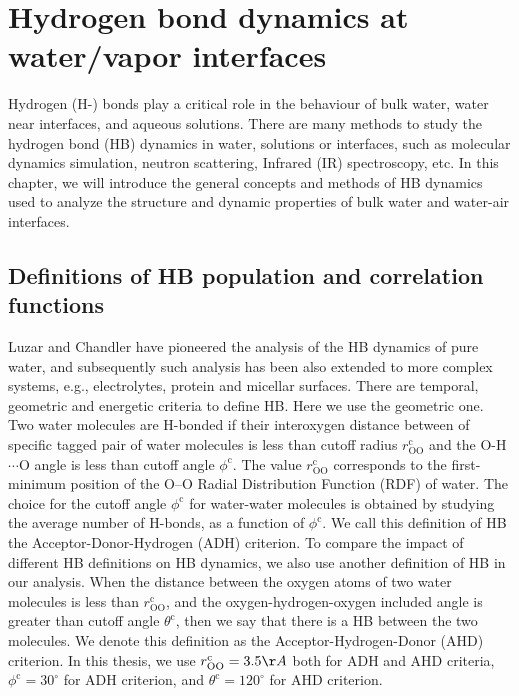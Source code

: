 \chapter{Hydrogen bond dynamics at water/vapor interfaces}\label{CHAPTER_HB}
Hydrogen (H-) bonds play a critical role in the behaviour of bulk water,\cite{Eisenberg1969,Luzar1996,Cabane2005} 
water near interfaces,\cite{Chowdhary2008} and aqueous solutions. \cite{Naslund2005} 
There are many methods to study the hydrogen bond (HB) dynamics in water, solutions or interfaces, 
such as molecular dynamics simulation,\cite{Tongraar2006,Chanda2006,Tongraar2010,Chowdhary2008,Banerjee2016} neutron scattering, 
Infrared (IR) spectroscopy,\cite{Werhahn2011,Fournier2016} etc.
In this chapter, we will introduce the general concepts and methods of HB dynamics \cite{AL96,Luzar1996,DC87} used to analyze the structure 
and dynamic properties of bulk water and water-air interfaces. 

\section{Definitions of HB population and correlation functions}
Luzar and Chandler \cite{AL96} have pioneered the analysis of the HB dynamics of pure water, and
subsequently such analysis has been also extended to more complex systems, e.g., electrolytes, \cite{AC00} protein and  micellar surfaces. \cite{SP05}
There are temporal, geometric\cite{Kumar2007} and energetic criteria \cite{Sciortino1989}to define HB.
Here we use the geometric one.
Two water molecules are H-bonded if their interoxygen distance between of specific tagged pair of water molecules 
is less than cutoff radius $r^{\text{c}}_{\text{OO}}$ and
the O-H$\cdots$O angle is less than cutoff angle $\phi^{\text{c}}$. \cite{AKS86,JT90,SB02} 
The value $r^{\text{c}}_{\text{OO}}$ corresponds to the first-minimum position of the O--O Radial Distribution Function (RDF) of water. \cite{Sciortino1989}   
The choice for the cutoff angle $\phi^{\text{c}}$ for water-water molecules is obtained by studying the average number of H-bonds,
as a function of $\phi^{\text{c}}$. \cite{Luzar1993} We call this definition of HB the Acceptor-Donor-Hydrogen (ADH) criterion. 
To compare the impact of different HB definitions on HB dynamics, we also use another definition of HB in our analysis. 
When the distance between the oxygen atoms of two water molecules is less than $r^{\text{c}}_{\text{OO}}$, 
and the oxygen-hydrogen-oxygen included angle is greater than cutoff angle $\theta^{\text{c}}$, then we say that there is a HB between the two molecules. 
We denote this definition as the Acceptor-Hydrogen-Donor (AHD) criterion.
In this thesis, we use $r^{\text{c}}_{\text{OO}}=3.5\AA$ both for ADH and AHD criteria, $\phi^{\text{c}}=30^{\circ}$ for ADH criterion, 
and $\theta^{\text{c}}=120^{\circ}$ for AHD criterion.

